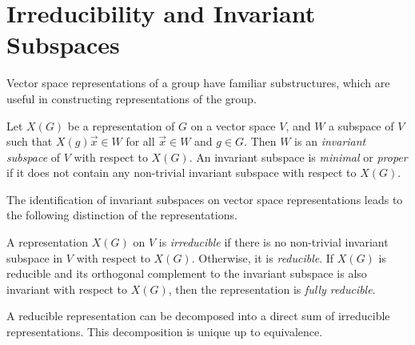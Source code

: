 \section{Irreducibility and Invariant Subspaces}

Vector space representations of a group have familiar substructures, which are useful in constructing representations of the group.
\begin{definition}
    Let $X(G)$ be a representation of $G$ on a vector space $V$, and $W$ a subspace of $V$ such that $X(g)\vec{x}\in W$ for all $\vec{x}\in W$ and $g\in G$. Then $W$ is an \textit{invariant subspace} of $V$ with respect to $X(G)$. An invariant subspace is \textit{minimal} or \textit{proper} if it does not contain any non-trivial invariant subspace with respect to $X(G)$.
\end{definition}

The identification of invariant subspaces on vector space representations leads to the following distinction of the representations.
\begin{definition}
    A representation $X(G)$ on $V$ is \textit{irreducible} if there is no non-trivial invariant subspace in $V$ with respect to $X(G)$. Otherwise, it is \textit{reducible}. If $X(G)$ is reducible and its orthogonal complement to the invariant subspace is also invariant with respect to $X(G)$, then the representation is \textit{fully reducible}.
\end{definition}

A reducible representation can be decomposed into a direct sum of irreducible representations. This decomposition is unique up to equivalence.

